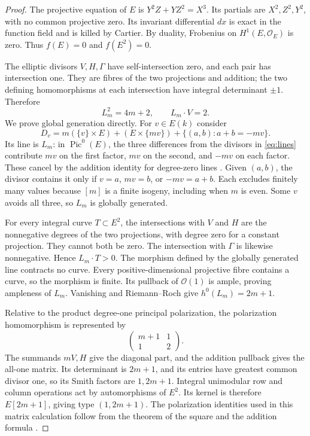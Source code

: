 \documentclass[11pt]{article}
\theoremstyle{remark}\newtheorem{remark}[theorem]{Remark}
\newcommand{\OO}{\mathcal O}
\newcommand{\Pic}{\operatorname{Pic}}
\begin{document}
\begin{proof}
The projective equation of $E$ is $Y^2Z+YZ^2=X^3$. Its partials are $X^2,Z^2,Y^2$, with no common projective zero. Its invariant differential $dx$ is exact in the function field and is killed by Cartier. By duality, Frobenius on $H^1(E,\OO_E)$ is zero. Thus $f(E)=0$ and $f(E^2)=0$.

The elliptic divisors $V,H,\Gamma$ have self-intersection zero, and each pair has intersection one. They are fibres of the two projections and addition; the two defining homomorphisms at each intersection have integral determinant $\pm1$. Therefore
\[
                         L_m^2=4m+2,\qquad L_m\cdot V=2.
\]
We prove global generation directly. For $v\in E(k)$ consider
\[
 D_v=m(\{v\}\times E)+(E\times\{mv\})
                      +\{(a,b):a+b=-mv\}.
\]
Its line is $L_m$: in $\Pic^0(E)$, the three differences from the divisors in \eqref{eq:lines} contribute $mv$ on the first factor, $mv$ on the second, and $-mv$ on each factor. These cancel by the addition identity for degree-zero lines \citep[Proposition~I.8.4 and Remark~I.8.5, pp.~35--36]{Milne}. Given $(a,b)$, the divisor contains it only if $v=a$, $mv=b$, or $-mv=a+b$. Each excludes finitely many values because $[m]$ is a finite isogeny, including when $m$ is even. Some $v$ avoids all three, so $L_m$ is globally generated.

For every integral curve $T\subset E^2$, the intersections with $V$ and $H$ are the nonnegative degrees of the two projections, with degree zero for a constant projection. They cannot both be zero. The intersection with $\Gamma$ is likewise nonnegative. Hence $L_m\cdot T>0$. The morphism defined by the globally generated line contracts no curve. Every positive-dimensional projective fibre contains a curve, so the morphism is finite. Its pullback of $\OO(1)$ is ample, proving ampleness of $L_m$. Vanishing and Riemann--Roch give $h^0(L_m)=2m+1$.

Relative to the product degree-one principal polarization, the polarization homomorphism is represented by
\begin{equation}\label{eq:polarization-matrix}
                         \begin{pmatrix}m+1&1\\1&2\end{pmatrix}.
\end{equation}
The summands $mV,H$ give the diagonal part, and the addition pullback gives the all-one matrix. Its determinant is $2m+1$, and its entries have greatest common divisor one, so its Smith factors are $1,2m+1$. Integral unimodular row and column operations act by automorphisms of $E^2$. Its kernel is therefore $E[2m+1]$, giving type $(1,2m+1)$. The polarization identities used in this matrix calculation follow from the theorem of the square and the addition formula \citep[Theorem~I.5.5 and Proposition~I.8.4, pp.~23 and 35--36]{Milne}.
\end{proof}
\end{document}
